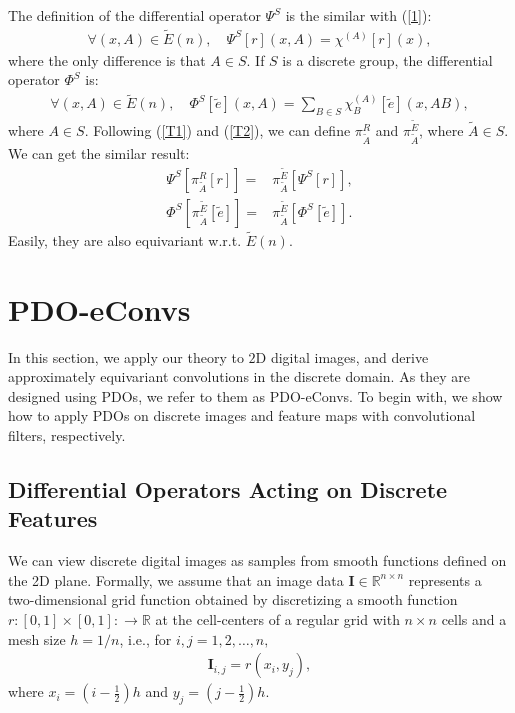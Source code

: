 \documentclass{article}
\begin{document}
The definition of the differential operator $\Psi^S$ is the similar with (\ref{1}):
\begin{align}
\forall (x,A)\in \tilde{E}(n),\quad \Psi^S [r](x,A)=\chi^{(A)}[r](x),
\label{5}
\end{align}
where the only difference is that $A \in S$. If $S$ is a discrete group, the differential operator $\Phi^S$ is:
\begin{align}
\forall (x,A)\in \tilde{E}(n),\quad\Phi^S [\tilde e] (x,A)=\sum\limits_{B\in S} \chi^{(A)}_{B} [\tilde e](x,AB),
\label{6}
\end{align}
where $A \in S$. Following (\ref{T1}) and (\ref{T2}), we can define $\pi^{R}_{\widetilde A}$ and $\pi^{\tilde{E}}_{\widetilde A}$, where $\tilde A \in S$. We can get the similar result:
\begin{align}
\Psi^S \left[\pi^{R}_{\widetilde A}[r]\right]=&\pi^{\tilde{E}}_{\widetilde A}\left[\Psi^S[r]\right],\\
\Phi^S \left[\pi^{\tilde{E}}_{\widetilde A}[\tilde e]\right]=&\pi^{\tilde E}_{\widetilde A}\left[\Phi^S [\tilde e]\right]. \label{8}
\end{align}
Easily, they are also equivariant w.r.t. $\tilde E(n)$.

\section{PDO-eConvs \label{section4}}
In this section, we apply our theory to $2$D digital images, and derive approximately equivariant convolutions in the discrete domain. As they are designed using PDOs, we refer to them as PDO-eConvs. To begin with, we show how to apply PDOs on discrete images and feature maps with convolutional filters, respectively.

\subsection{Differential Operators Acting on Discrete Features}

We can view discrete digital images as samples from smooth functions defined on the 2D plane. Formally, we assume that an image data $\bm{I}\in \mathbb{R}^{n\times n}$ represents a two-dimensional grid function obtained by discretizing a smooth function $r:[0,1]\times [0,1]:\to \mathbb{R}$ at the cell-centers of a regular grid with $n\times n$ cells and a mesh size $h=1/n$, i.e., for $i,j=1,2,\dots,n,$
\begin{align*}
\bm{I}_{i,j}=r(x_i,y_j), 
\end{align*}
where $x_i=(i-\frac{1}{2})h$ and $y_j=(j-\frac{1}{2})h$. 
\end{document}
